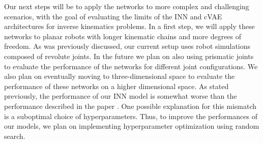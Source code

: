 \documentclass[conference]{IEEEtran}
\begin{document}
Our next steps will be to apply the networks to more complex and challenging scenarios, with the goal of evaluating the limits of the INN and cVAE architectures for inverse kinematics problems. In a first step, we will apply these networks to planar robots with longer kinematic chains and more degrees of freedom. As was previously discussed, our current setup uses robot simulations composed of revolute joints. In the future we plan on also using prismatic joints to evaluate the performance of the networks for different joint configurations. We also plan on eventually moving to three-dimensional space to evaluate the performance of these networks on a higher dimensional space. As stated previously, the performance of our INN model is somewhat worse than the performance described in the paper \cite{Ardizzone2018}. One possible explanation for this mismatch is a suboptimal choice of hyperparameters. Thus, to improve the performances of our models, we plan on implementing hyperparameter optimization using random search.

\nocite{*}


\end{document}
